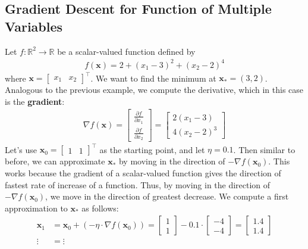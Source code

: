 \documentclass[12pt, a4paper]{article}
\theoremstyle{definition}
\begin{document}
	\subsection*{Gradient Descent for Function of Multiple Variables}
	Let $f:\mathbb{R}^2\to\mathbb{R}$ be a scalar-valued function defined by
	\begin{align*}
		f(\bm{x}) = 2 + (x_1 - 3)^2 + (x_2 - 2)^4
	\end{align*}
	where $\bm{x} = \begin{bmatrix}
		x_1 & x_2
	\end{bmatrix}^\top$. We want to find the minimum at $\bm{x}_*=(3, 2)$. Analogous to
	the previous example, we compute the derivative, which in this case is
	the \textbf{gradient}:
	\begin{align*}
		\nabla f(\bm{x}) = \begin{bmatrix}
			\frac{\partial f}{\partial x_1}\\
			\frac{\partial f}{\partial x_2}
		\end{bmatrix}
		=
		\begin{bmatrix}
			2(x_1 - 3)\\
			4(x_2 - 2)^3
		\end{bmatrix}
	\end{align*}
	Let's use $\bm{x}_0 = \begin{bmatrix}
		1 & 1
	\end{bmatrix}^\top$
	as the starting point, and let $\eta = 0.1$. Then similar to before, we
	can approximate $\bm{x}_*$ by moving in the direction of $-\nabla f(\bm{x}_0)$.
	This works because the gradient of a scalar-valued function gives the direction
	of fastest rate of increase of a function. Thus, by moving in the direction
	of $-\nabla f(\bm{x}_0)$, we move in the direction of greatest decrease.
	We compute a first approximation to $\bm{x}_*$ as follows:
	\begin{align*}
		\bm{x}_1 &= \bm{x}_0 + (-\eta \cdot \nabla f(\bm{x}_0))
		= \begin{bmatrix}
			1\\
			1
		\end{bmatrix}
		- 0.1 \cdot \begin{bmatrix}
			-4\\
			-4
		\end{bmatrix}=
		\begin{bmatrix}
			1.4\\
			1.4
		\end{bmatrix}\\
		\vdots &= \vdots
	\end{align*}
\end{document}
